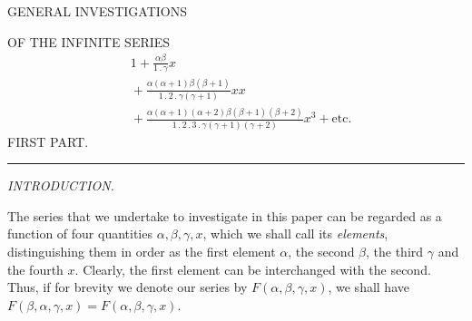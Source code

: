 \clearpage{}
\begin{center}
GENERAL INVESTIGATIONS

\medskip
OF THE INFINITE SERIES
\[
\begin{aligned}&1+\frac{\alpha\beta}{1\mathbin{.}\gamma}x\\
&{}+\frac{\alpha(\alpha+1)\beta(\beta+1)}{1\mathbin{.}2\mathbin{.}\gamma(\gamma+1)}xx\\
&{}+\frac{\alpha(\alpha+1)(\alpha+2)\beta(\beta+1)(\beta+2)}{1\mathbin{.}2\mathbin{.}3\mathbin{.}\gamma(\gamma+1)(\gamma+2)}x^3+\mathrm{etc.}
\end{aligned}
\]
FIRST PART.

\medskip
\rule{0.13\linewidth}{0.4pt}

\medskip
\textit{INTRODUCTION.}

\end{center}
The series that we undertake to investigate in this paper can be regarded as a function of four quantities $\alpha,\beta,\gamma,x$, which we shall call its \textit{elements}, distinguishing them in order as the first element $\alpha$, the second $\beta$, the third $\gamma$ and the fourth $x$. Clearly, the first element can be interchanged with the second. Thus, if for brevity we denote our series by $F(\alpha,\beta,\gamma,x)$, we shall have $F(\beta,\alpha,\gamma,x)=F(\alpha,\beta,\gamma,x)$.

